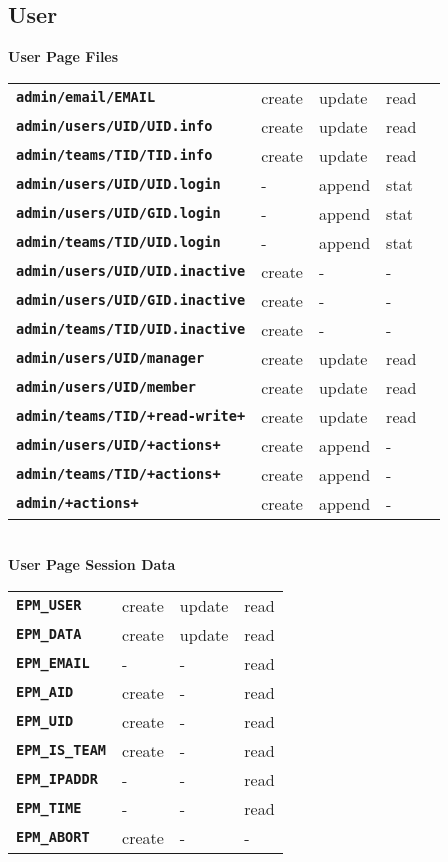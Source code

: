 \documentclass[12pt]{article}
\newcommand{\TT}[1]{{\tt \bfseries #1}}
\begin{document}
\subsection{User}

\begin{center}
{\bf User Page Files}
\\[1ex]
\begin{tabular}{lllll}
\TT{admin/email/EMAIL}	& create  & update & read \\
\TT{admin/users/UID/UID.info}
			& create  & update & read \\
\TT{admin/teams/TID/TID.info}
			& create  & update & read \\
\TT{admin/users/UID/UID.login}
			& -       & append & stat \\
\TT{admin/users/UID/GID.login}
			& -       & append & stat \\
\TT{admin/teams/TID/UID.login}
			& -       & append & stat \\
\TT{admin/users/UID/UID.inactive}
			& create  & -      & - \\
\TT{admin/users/UID/GID.inactive}
			& create  & -      & - \\
\TT{admin/teams/TID/UID.inactive}
			& create  & -      & - \\
\TT{admin/users/UID/manager}
			& create  & update & read \\
\TT{admin/users/UID/member}
			& create  & update & read \\
\TT{admin/teams/TID/+read-write+}
			& create  & update & read \\
\TT{admin/users/UID/+actions+}
			& create  & append & - \\
\TT{admin/teams/TID/+actions+}
			& create  & append & - \\
\TT{admin/+actions+}
			& create  & append & - \\
\end{tabular}
\\[3ex]
{\bf User Page Session Data}
\\[1ex]
\begin{tabular}{llll}
\TT{EPM\_USER}	& create  & update & read \\
\TT{EPM\_DATA}	& create  & update & read \\
\TT{EPM\_EMAIL}	& -       & -      & read \\
\TT{EPM\_AID}	& create  & -      & read \\
\TT{EPM\_UID}	& create  & -      & read \\
\TT{EPM\_IS\_TEAM}
                & create  & -      & read \\
\TT{EPM\_IPADDR}& -       & -      & read \\
\TT{EPM\_TIME}  & -       & -      & read \\
\TT{EPM\_ABORT} & create  & -      & - \\
\end{tabular}
\end{center}
\end{document}
